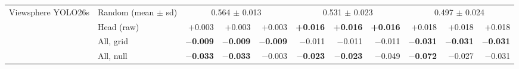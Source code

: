 \begin{tabular}{llrrrrrrrrr}
\midrule
Viewsphere YOLO26s & Random (mean $\pm$ sd) & \multicolumn{3}{c}{0.564 $\pm$ 0.013} & \multicolumn{3}{c}{0.531 $\pm$ 0.023} & \multicolumn{3}{c}{0.497 $\pm$ 0.024} \\
 & Head (raw) & +0.003 & +0.003 & +0.003 & \textbf{+0.016} & \textbf{+0.016} & \textbf{+0.016} & +0.018 & +0.018 & +0.018 \\
 & All, grid & \textbf{$-$0.009} & \textbf{$-$0.009} & \textbf{$-$0.009} & $-$0.011 & $-$0.011 & $-$0.011 & \textbf{$-$0.031} & \textbf{$-$0.031} & \textbf{$-$0.031} \\
 & All, null & \textbf{$-$0.033} & \textbf{$-$0.033} & $-$0.003 & \textbf{$-$0.023} & \textbf{$-$0.023} & $-$0.049 & \textbf{$-$0.072} & $-$0.027 & $-$0.031 \\
\bottomrule
\end{tabular}
